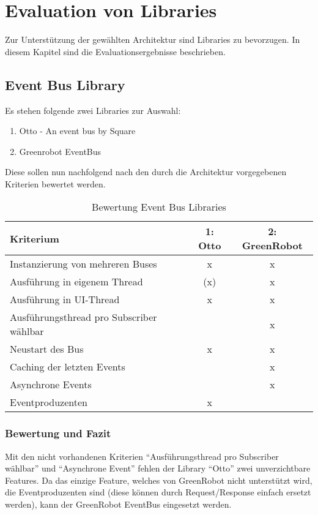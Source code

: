 \section{Evaluation von Libraries}
\label{sec:Evaluation von Libraries}
Zur Unterstützung der gewählten Architektur sind Libraries zu bevorzugen. In diesem Kapitel sind die Evaluationsergebnisse beschrieben.

\subsection{Event Bus Library}
Es stehen folgende zwei Libraries zur Auswahl:
\begin{enumerate}
\item Otto - An event bus by Square
\item Greenrobot EventBus
\end{enumerate}
Diese sollen nun nachfolgend nach den durch die Architektur vorgegebenen Kriterien bewertet werden.

\begin{table}[H]
\begin{tabular}{|p{8cm}|c|c|}
 \hline 
\textbf{Kriterium} & \textbf{1: Otto} & \textbf{2: GreenRobot} 
\\ \hline

Instanzierung von mehreren Buses & x & x
\\ \hline

Ausführung in eigenem Thread & (x) & x
\\ \hline

Ausführung in \ac{UI}-Thread & x & x
\\ \hline

Ausführungsthread pro Subscriber wählbar &   & x
\\ \hline

Neustart des Bus & x & x
\\ \hline

Caching der letzten Events &   & x
\\ \hline

Asynchrone Events &   & x
\\ \hline

Eventproduzenten & x & 
\\ \hline

\end{tabular}
\caption{Bewertung Event Bus Libraries}
\end{table}

\subsubsection{Bewertung und Fazit}
Mit den nicht vorhandenen Kriterien \enquote{Ausführungsthread pro Subscriber wählbar} und \enquote{Asynchrone Event} fehlen der Library \enquote{Otto} zwei unverzichtbare Features. Da das einzige Feature, welches von GreenRobot nicht unterstützt wird, die Eventproduzenten sind (diese können durch Request/Response einfach ersetzt werden), kann der GreenRobot EventBus eingesetzt werden.

